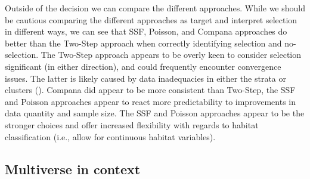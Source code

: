 \documentclass[10pt,a4paper]{article}
\begin{document}
Outside of the decision we can compare the different approaches.
While we should be cautious comparing the different approaches as target and interpret selection in different ways, we can see that SSF, Poisson, and Compana approaches do better than the Two-Step approach when correctly identifying selection and no-selection.
The Two-Step approach appears to be overly keen to consider selection significant (in either direction), and could frequently encounter convergence issues.
The latter is likely caused by data inadequacies in either the strata or clusters ().
Compana did appear to be more consistent than Two-Step, the SSF and Poisson approaches appear to react more predictability to improvements in data quantity and sample size.
The SSF and Poisson approaches appear to be the stronger choices and offer increased flexibility with regards to habitat classification (i.e., allow for continuous habitat variables).

\subsection{Multiverse in context}\label{multiverse-in-context}
\end{document}
